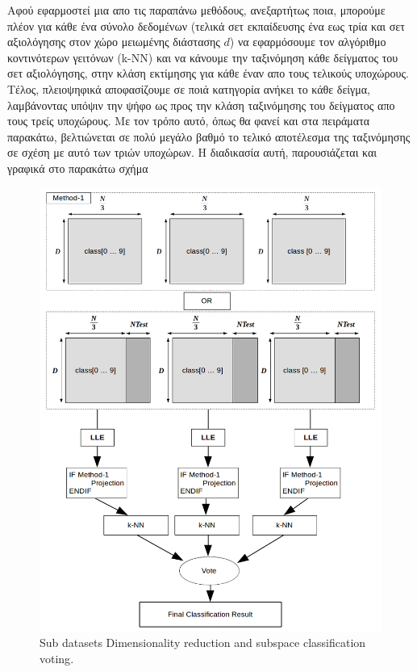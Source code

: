 \par
Αφού εφαρμοστεί μια απο τις παραπάνω μεθόδους, ανεξαρτήτως ποια, μπορούμε πλέον για κάθε ένα σύνολο δεδομένων (τελικά σετ εκπαίδευσης ένα εως τρία και σετ αξιολόγησης στον χώρο μειωμένης διάστασης $d$) να εφαρμόσουμε τον αλγόριθμο κοντινότερων γειτόνων \textlatin{(k-NN)} και να κάνουμε την ταξινόμηση κάθε δείγματος του σετ αξιολόγησης, στην κλάση εκτίμησης για κάθε έναν απο τους τελικούς υποχώρους. Τέλος, πλειοψηφικά αποφασίζουμε σε ποιά κατηγορία ανήκει το κάθε δείγμα, λαμβάνοντας υπόψιν την ψήφο ως προς την κλάση ταξινόμησης του δείγματος απο τους τρείς υποχώρους. Με τον τρόπο αυτό, όπως θα φανεί και στα πειράματα παρακάτω, βελτιώνεται σε πολύ μεγάλο βαθμό το τελικό αποτέλεσμα της ταξινόμησης σε σχέση με αυτό των τριών υποχώρων. Η διαδικασία αυτή, παρουσιάζεται και γραφικά στο παρακάτω σχήμα
\newpage
\begin{figure}[t!]
\centering
\includegraphics[scale=0.8]{figs/6.png}
\newline
\caption{ \textlatin{Sub datasets Dimensionality reduction and subspace classification voting}.} 
\end{figure}
\newpage
\par


